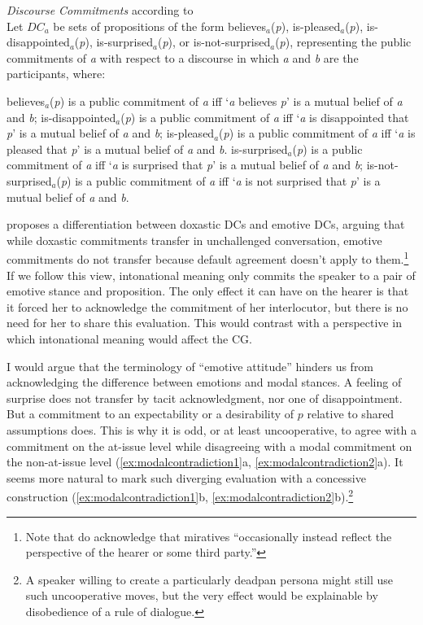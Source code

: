 \begin{exe}
\ex\label{ex:discoursecommitments} \textit{Discourse Commitments} according to \citet[326]{Rett.2021emotivemarkers}\\
Let $\textit{DC}_{a}$ be sets of propositions of the form believes$_a$(\textit{p}), is-pleased$_a$(\textit{p}), is-disappointed$_a$(\textit{p}), is-surprised$_a$(\textit{p}), or is-not-surprised$_a$(\textit{p}), representing the public commitments of \textit{a} with respect to a discourse in which \textit{a} and \textit{b} are the participants, where:
\begin{xlist}
	\ex believes$_a$(\textit{p}) is a public commitment of \textit{a} iff `\textit{a} believes \textit{p}' is a mutual belief of \textit{a} and \textit{b};
	\ex is-disappointed$_a$(\textit{p}) is a public commitment of \textit{a} iff `\textit{a} is disappointed that \textit{p}' is a mutual belief of \textit{a} and \textit{b};
	\ex is-pleased$_a$(\textit{p}) is a public commitment of \textit{a} iff `\textit{a} is pleased that \textit{p}' is a mutual belief of \textit{a} and \textit{b}.
	\ex is-surprised$_a$(\textit{p}) is a public commitment of \textit{a} iff `\textit{a} is surprised that \textit{p}' is a mutual belief of \textit{a} and \textit{b};
	\ex is-not-surprised$_a$(\textit{p}) is a public commitment of \textit{a} iff `\textit{a} is not surprised that \textit{p}' is a mutual belief of \textit{a} and \textit{b}.
\end{xlist}
\end{exe}

\citet[335]{Rett.2021emotivemarkers} proposes a differentiation between doxastic \acp{DC} and emotive \acp{DC}, arguing that while doxastic commitments transfer in unchallenged conversation, emotive commitments do not transfer because default agreement doesn't apply to them.\footnote{Note that \citet{RettSturman.2020} do acknowledge that miratives ``occasionally instead reflect the perspective of the hearer or some third party.''} If we follow this view, intonational meaning only commits the speaker to a pair of emotive stance and proposition. The only effect it can have on the hearer is that it forced her to acknowledge the commitment of her interlocutor, but there is no need for her to share this evaluation. This would contrast with a perspective in which intonational meaning would affect the \ac{CG}.

I would argue that the terminology of ``emotive attitude'' hinders us from acknowledging the difference between emotions and modal stances. A feeling of surprise does not transfer by tacit acknowledgment, nor one of disappointment. But a commitment to an expectability or a desirability of $p$ relative to shared assumptions does. This is why it is odd, or at least uncooperative, to agree with a commitment on the at-issue level while disagreeing with a modal commitment on the non-at-issue level (\ref{ex:modalcontradiction1}a, \ref{ex:modalcontradiction2}a). It seems more natural to mark such diverging evaluation with a concessive construction (\ref{ex:modalcontradiction1}b, \ref{ex:modalcontradiction2}b).\footnote{A speaker willing to create a particularly deadpan persona might still use such uncooperative moves, but the very effect would be explainable by disobedience of a rule of dialogue.}\largerpage

